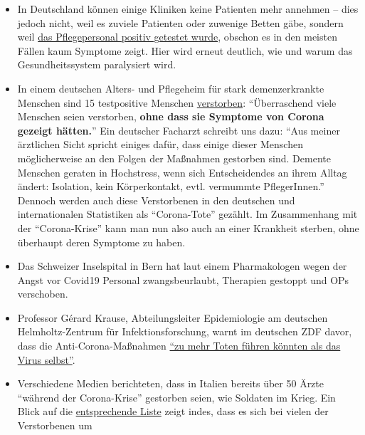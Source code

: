 \begin{itemize}
\tightlist
\item
  In Deutschland können einige Kliniken keine Patienten mehr annehmen --
  dies jedoch nicht, weil es zuviele Patienten oder zuwenige Betten
  gäbe, sondern weil
  \href{https://web.archive.org/web/20200330082928/https://www.sueddeutsche.de/panorama/coronavirus-news-deutschland-wolfsburg-laschet-1.4828033}{das
  Pflege­personal positiv getestet wurde}, obschon es in den meisten
  Fällen kaum Symptome zeigt. Hier wird erneut deutlich, wie und warum
  das Gesundheitssystem paralysiert wird.
\item
  In einem deutschen Alters- und Pflegeheim für stark demenzerkrankte
  Menschen sind 15 test­positive Menschen
  \href{https://web.archive.org/web/20200330082928/https://www.sueddeutsche.de/panorama/coronavirus-news-deutschland-wolfsburg-laschet-1.4828033}{verstorben}:
  ``Überraschend viele Menschen seien verstorben, \textbf{ohne dass sie
  Symptome von Corona gezeigt hätten.}'' Ein deutscher Facharzt schreibt
  uns dazu: ``Aus meiner ärztlichen Sicht spricht einiges dafür, dass
  einige dieser Menschen möglicherweise an den Folgen der Maßnahmen
  gestorben sind. Demente Menschen geraten in Hochstress, wenn sich
  Entschei­dendes an ihrem Alltag ändert: Isolation, kein Körperkontakt,
  evtl. vermummte PflegerInnen.'' Dennoch werden auch diese Verstorbenen
  in den deutschen und internationalen Statistiken als ``Corona-Tote''
  gezählt. Im Zusam­men­hang mit der ``Corona-Krise'' kann man nun also
  auch an einer Krankheit sterben, ohne überhaupt deren Symptome zu
  haben.
\item
  Das Schweizer Inselspital in Bern hat laut einem Pharmakologen wegen
  der Angst vor Covid19 Personal zwangsbeurlaubt, Therapien gestoppt und
  OPs verschoben.
\item
  Professor Gérard Krause, Abteilungsleiter Epidemiologie am deutschen
  Helmholtz-Zentrum für Infektionsforschung, warnt im deutschen ZDF
  davor, dass die Anti-Corona-Maßnahmen
  \href{https://www.zdf.de/nachrichten/politik/coronavirus-epidemiologe-folgen-helmholtz-100.html}{``zu
  mehr Toten führen könnten als das Virus selbst''}.
\item
  Verschiedene Medien berichteten, dass in Italien bereits über 50 Ärzte
  ``während der Corona-Krise'' gestorben seien, wie Soldaten im Krieg.
  Ein Blick auf die
  \href{https://web.archive.org/web/20200328152430/https://portale.fnomceo.it/elenco-dei-medici-caduti-nel-corso-dellepidemia-di-covid-19/}{entsprechende
  Liste} zeigt indes, dass es sich bei vielen der Verstorbenen um

\end{itemize}
